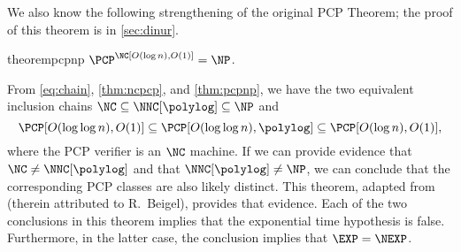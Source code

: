We also know the following strengthening of the original PCP Theorem; the proof of this theorem is in \autoref{sec:dinur}.
\begin{restatable}{theorem}{pcpnp}\label{thm:pcpnp}
  $\PCP^\NC[O(\log n), O(1)] = \NP$.
\end{restatable}

From \autoref{eq:chain}, \autoref{thm:ncpcp}, and \autoref{thm:pcpnp}, we have the two equivalent inclusion chains
$
  \NC \subseteq \NNC[\polylog] \subseteq \NP
$
and
\begin{equation*}
  \PCP[O(\loglog n), O(1)] \subseteq \PCP[O(\loglog n), \polylog] \subseteq \PCP[O(\log n), O(1)],
\end{equation*}
where the PCP verifier is an $\NC$ machine.
If we can provide evidence that $\NC \neq \NNC[\polylog]$ and that $\NNC[\polylog] \neq \NP$, we can conclude that the corresponding PCP classes are also likely distinct.
This theorem, adapted from \autocite[Theorem~1]{dt90} (therein attributed to R.~Beigel), provides that evidence.
Each of the two conclusions in this theorem implies that the exponential time hypothesis is false.
Furthermore, in the latter case, the conclusion implies that $\EXP = \NEXP$.

